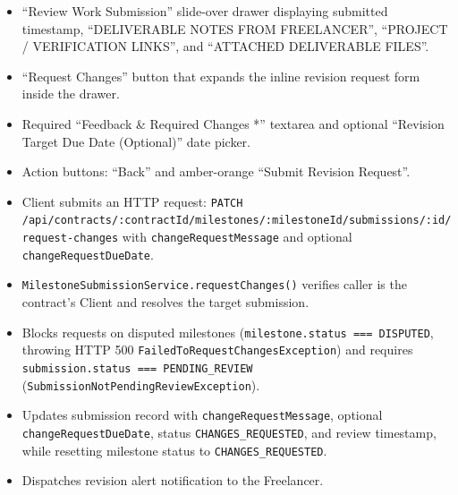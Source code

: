 \begin{itemize}[leftmargin=1.6em,topsep=3pt,itemsep=2pt,parsep=0pt,label=$\bullet$]
      \item ``Review Work Submission'' slide-over drawer displaying submitted timestamp, ``DELIVERABLE NOTES FROM FREELANCER'', ``PROJECT / VERIFICATION LINKS'', and ``ATTACHED DELIVERABLE FILES''.
      \item ``Request Changes'' button that expands the inline revision request form inside the drawer.
      \item Required ``Feedback \& Required Changes *'' textarea and optional ``Revision Target Due Date (Optional)'' date picker.
      \item Action buttons: ``Back'' and amber-orange ``Submit Revision Request''.
\end{itemize}

\begin{itemize}[leftmargin=1.6em,topsep=3pt,itemsep=2pt,parsep=0pt,label=$\bullet$]
      \item Client submits an HTTP request: \texttt{PATCH /\allowbreak{}api/\allowbreak{}contracts/\allowbreak{}:\allowbreak{}contractId/\allowbreak{}milestones/\allowbreak{}:\allowbreak{}milestoneId/\allowbreak{}submissions/\allowbreak{}:\allowbreak{}id/\allowbreak{}request-\allowbreak{}changes} with \texttt{changeRequestMessage} and optional \texttt{changeRequestDueDate}.
      \item \texttt{Milestone\allowbreak{}Submission\allowbreak{}Service.\allowbreak{}requestChanges()} verifies caller is the contract's Client and resolves the target submission.
      \item Blocks requests on disputed milestones (\texttt{milestone.status === DISPUTED}, throwing HTTP 500 \texttt{FailedToRequestChangesException}) and requires \texttt{submission.status === PENDING\_REVIEW} (\texttt{SubmissionNotPendingReviewException}).
      \item {\sloppy Updates submission record with \texttt{changeRequestMessage}, optional \texttt{changeRequestDueDate}, status \texttt{CHANGES\_REQUESTED}, and review timestamp, while resetting milestone status to \texttt{CHANGES\_REQUESTED}.\par}
      \item Dispatches revision alert notification to the Freelancer.
\end{itemize}

